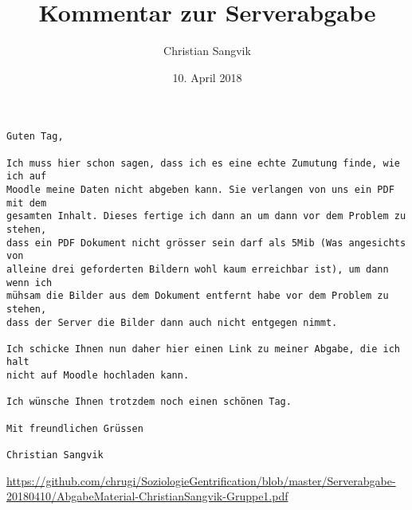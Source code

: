 \documentclass[a4paper,ngerman,11pt]{scrartcl}
\author{Christian Sangvik}
\date{10. April 2018}
\title{Kommentar zur Serverabgabe}
\begin{document}
\maketitle
\begin{verbatim}
Guten Tag,

Ich muss hier schon sagen, dass ich es eine echte Zumutung finde, wie ich auf
Moodle meine Daten nicht abgeben kann. Sie verlangen von uns ein PDF mit dem
gesamten Inhalt. Dieses fertige ich dann an um dann vor dem Problem zu stehen,
dass ein PDF Dokument nicht grösser sein darf als 5Mib (Was angesichts von
alleine drei geforderten Bildern wohl kaum erreichbar ist), um dann wenn ich
mühsam die Bilder aus dem Dokument entfernt habe vor dem Problem zu stehen,
dass der Server die Bilder dann auch nicht entgegen nimmt.

Ich schicke Ihnen nun daher hier einen Link zu meiner Abgabe, die ich halt
nicht auf Moodle hochladen kann.

Ich wünsche Ihnen trotzdem noch einen schönen Tag.

Mit freundlichen Grüssen

Christian Sangvik
\end{verbatim}

\url{https://github.com/chrugi/SoziologieGentrification/blob/master/Serverabgabe-20180410/AbgabeMaterial-ChristianSangvik-Gruppe1.pdf}
\end{document}
